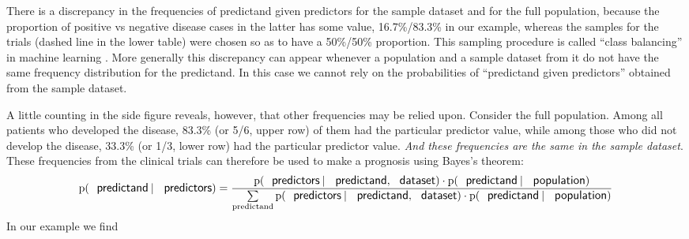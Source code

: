 \documentclass[utf8]{FrontiersinHarvard} %
\newcommand*{\p}{\mathrm{p}}%
\renewcommand*{\|}[1][]{\nonscript\:#1\vert\nonscript\:\mathopen{}}
\begin{document}
There is a discrepancy in the frequencies of predictand given predictors for the sample dataset and for the full population, because the proportion of positive vs negative disease cases in the latter has some value, 16.7\%/83.3\% in our example, whereas the samples for the trials (dashed line in the lower table) were chosen so as to have a 50\%/50\% proportion. This sampling procedure is called \enquote{class balancing} in machine learning \citep{provost2000,drummondetal2005,weissetal2003}. More generally this discrepancy can appear whenever a population and a sample dataset from it do not have the same frequency distribution for the predictand. In this case we cannot rely on the probabilities of \enquote{predictand given predictors} obtained from the sample dataset.

A little counting in the side figure reveals, however, that other frequencies may be relied upon. Consider the full population. Among all patients who developed the disease, 83.3\% (or 5/6, upper row) of them had the particular predictor value, while among those who did not develop the disease, 33.3\% (or 1/3, lower row) had the particular predictor value. \emph{And these frequencies are the same in the sample dataset}. These frequencies from the clinical trials can therefore be used to make a prognosis using Bayes's theorem:
\begin{equation}
  \label{eq:base-rate_correction}
  \p(\textsf{\small predictand} \| \textsf{\small predictors}) =
  \frac{
    \p(\textsf{\small predictors} \| \textsf{\small predictand},
  \textsf{\small dataset})
  \cdot   \p(\textsf{\small predictand} \| \textsf{\small population})
}{\sum\limits_{\text{predictand}}
    \p(\textsf{\small predictors} \| \textsf{\small predictand},
  \textsf{\small dataset})
  \cdot   \p(\textsf{\small predictand} \| \textsf{\small population})
}
\end{equation}
In our example we find
\end{document}
